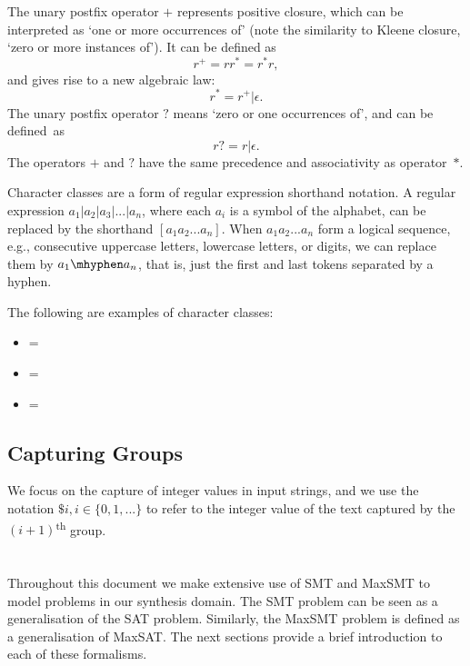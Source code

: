 The unary postfix operator \(+\) represents positive closure, which can be interpreted as `one or more occurrences of' (note the similarity to Kleene closure, `zero or more instances of'). It can be defined as
\[r^+ = rr^* = r^*r,\]
and gives rise to a new algebraic law:
\[r^* = r^+|\epsilon.\]
%
The unary postfix operator \(?\) means `zero or one
occurrences of', and can be defined~as
\[ r? = r|\epsilon. \]
%
The operators \(+\) and \(?\) have the same precedence and associativity as operator~\(*\).


Character classes are a form of regular expression shorthand notation. A regular expression \(a_1|a_2|a_3|...|a_n\), where each \(a_i\) is a symbol of the alphabet, can be replaced by the shorthand \([a_1 a_2...a_n]\).
When \(a_1 a_2...a_n\) form a logical sequence, e.g., consecutive uppercase letters, lowercase letters, or digits, we
can replace them by \(a_1\mhyphen a_n\), that is, just the first and last tokens separated by
a hyphen.


\begin{example}
The following are examples of character classes:
\begin{itemize}
\item \regex{[abc]} = 
\item \regex{[a\mhyphen z]} = 
\item {} = 
\end{itemize}
\end{example}

\subsection{Capturing Groups}


We focus on the capture of integer values in input strings, and we use the notation \(\$i, i \in \{0, 1, ...\}\) to refer to the integer value of the text captured by the \((i+1)\)\textsuperscript{th} group.

\section{}\label{sec:logic}

Throughout this document we make extensive use of \ac{SMT} and \ac{MaxSMT} to model problems in our synthesis domain.
%
The \ac{SMT} problem can be seen as a generalisation of the \ac{SAT} problem. Similarly, the \ac{MaxSMT} problem is defined as a generalisation of \ac{MaxSAT}. The next sections provide a brief introduction to each of these formalisms.

